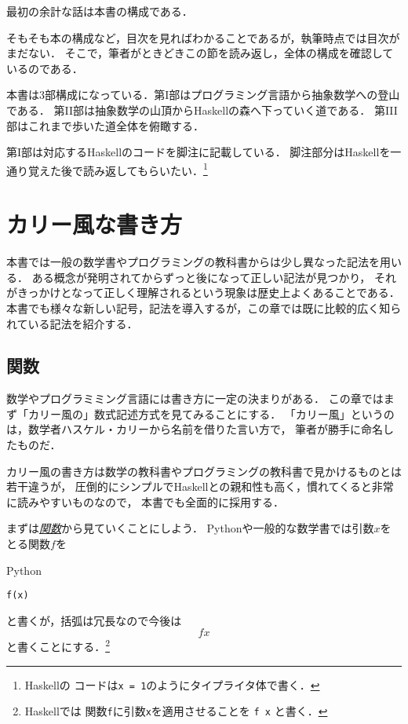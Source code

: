 \documentclass[a5paper,draft]{jsbook}
\newcommand{\programminglanguage}[1]{\textsf{#1}}
\newcommand{\haskell}{\programminglanguage{Haskell}}
\newcommand{\python}{\programminglanguage{Python}}
\newenvironment{leader}{\begingroup}{\endgroup}
\newcommand{\keyword}[1]{{\underline{\emph{#1}}}}
\newcommand{\code}[1]{\texttt{#1}}
\newenvironment{pythoncode}{\begin{itembox}[r]{\python}}{\end{itembox}}
\begin{document}
最初の余計な話は本書の構成である．

そもそも本の構成など，目次を見ればわかることであるが，執筆時点では目次がまだない．
そこで，筆者がときどきこの節を読み返し，全体の構成を確認しているのである．

本書は3部構成になっている．第I部はプログラミング言語から抽象数学への登山である．
第II部は抽象数学の山頂から\haskell の森へ下っていく道である．
第III部はこれまで歩いた道全体を俯瞰する．

第I部は対応する\haskell のコードを脚注に記載している．
脚注部分は\haskell を一通り覚えた後で読み返してもらいたい．\footnote{\haskell の
コードは\code{x = 1}のようにタイプライタ体で書く．}


\chapter{カリー風な書き方}

\begin{leader}
本書では一般の数学書やプログラミングの教科書からは少し異なった記法を用いる．
ある概念が発明されてからずっと後になって正しい記法が見つかり，
それがきっかけとなって正しく理解されるという現象は歴史上よくあることである．
本書でも様々な新しい記号，記法を導入するが，この章では既に比較的広く知られている記法を紹介する．
\end{leader}

\section{関数}

数学やプログラミミング言語には書き方に一定の決まりがある．
この章ではまず「カリー風の」数式記述方式を見てみることにする．
「カリー風」というのは，数学者ハスケル・カリーから名前を借りた言い方で，
筆者が勝手に命名したものだ．

カリー風の書き方は数学の教科書やプログラミングの教科書で見かけるものとは若干違うが，
圧倒的にシンプルで\haskell との親和性も高く，慣れてくると非常に読みやすいものなので，
本書でも全面的に採用する．

まずは\keyword{関数}から見ていくことにしよう．
\python や一般的な数学書では引数$x$をとる関数$f$を
\begin{pythoncode}
\begin{verbatim}
f(x)
\end{verbatim}
\end{pythoncode}
と書くが，括弧は冗長なので今後は
\begin{equation}
fx
\end{equation}
と書くことにする．\footnote{\haskell では
関数\code{f}に引数\code{x}を適用させることを \code{f x} と書く．}
\end{document}
